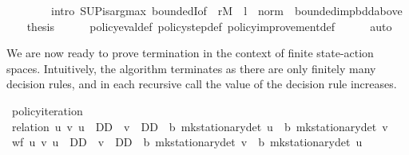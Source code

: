 \begin{isabellebody}
\ \ \ \ \ \ \ \ intro{\isacharbang}{\kern0pt}{\isacharcolon}{\kern0pt}\ SUP{\isacharunderscore}{\kern0pt}is{\isacharunderscore}{\kern0pt}arg{\isacharunderscore}{\kern0pt}max\ boundedI{\isacharbrackleft}{\kern0pt}of\ {\isacharunderscore}{\kern0pt}\ {\isachardoublequoteopen}r\isactrlsub M\ {\isacharplus}{\kern0pt}\ l\ {\isacharasterisk}{\kern0pt}\ norm\ {\isacharunderscore}{\kern0pt}{\isachardoublequoteclose}{\isacharbrackright}{\kern0pt}\ bounded{\isacharunderscore}{\kern0pt}imp{\isacharunderscore}{\kern0pt}bdd{\isacharunderscore}{\kern0pt}above{\isacharparenright}{\kern0pt}\isanewline
\ \ \isamarkupfalse%
\ {\isacharquery}{\kern0pt}thesis\isanewline
\ \ \ \ \isamarkupfalse%
\ policy{\isacharunderscore}{\kern0pt}eval{\isacharunderscore}{\kern0pt}def\ policy{\isacharunderscore}{\kern0pt}step{\isacharunderscore}{\kern0pt}def\ policy{\isacharunderscore}{\kern0pt}improvement{\isacharunderscore}{\kern0pt}def\isanewline
\ \ \ \ \isamarkupfalse%
\ auto\isanewline
{}\isamarkupfalse%
%
\endisatagproof
{\isafoldproof}%
%
\isadelimproof
%
\endisadelimproof
%
\begin{isamarkuptext}%
We are now ready to prove termination in the context of finite state-action spaces.
Intuitively, the algorithm terminates as there are only finitely many decision rules,
and in each recursive call the value of the decision rule increases.%
\end{isamarkuptext}\isamarkuptrue%
\isamarkupfalse%
\ policy{\isacharunderscore}{\kern0pt}iteration\isanewline
%
\isadelimproof
%
\endisadelimproof
%
\isatagproof
{}\isamarkupfalse%
\ {\isacharparenleft}{\kern0pt}relation\ {\isachardoublequoteopen}{\isacharbraceleft}{\kern0pt}{\isacharparenleft}{\kern0pt}u{\isacharcomma}{\kern0pt}\ v{\isacharparenright}{\kern0pt}{\isachardot}{\kern0pt}\ u\ {\isasymin}\ D\isactrlsub D\ {\isasymand}\ v\ {\isasymin}\ D\isactrlsub D\ {\isasymand}\ {\isasymnu}\isactrlsub b\ {\isacharparenleft}{\kern0pt}mk{\isacharunderscore}{\kern0pt}stationary{\isacharunderscore}{\kern0pt}det\ u{\isacharparenright}{\kern0pt}\ {\isachargreater}{\kern0pt}\ {\isasymnu}\isactrlsub b\ {\isacharparenleft}{\kern0pt}mk{\isacharunderscore}{\kern0pt}stationary{\isacharunderscore}{\kern0pt}det\ v{\isacharparenright}{\kern0pt}{\isacharbraceright}{\kern0pt}{\isachardoublequoteclose}{\isacharparenright}{\kern0pt}\isanewline
\ \ \isamarkupfalse%
\ {\isachardoublequoteopen}wf\ {\isacharbraceleft}{\kern0pt}{\isacharparenleft}{\kern0pt}u{\isacharcomma}{\kern0pt}\ v{\isacharparenright}{\kern0pt}{\isachardot}{\kern0pt}\ u\ {\isasymin}\ D\isactrlsub D\ {\isasymand}\ v\ {\isasymin}\ D\isactrlsub D\ {\isasymand}\ {\isasymnu}\isactrlsub b\ {\isacharparenleft}{\kern0pt}mk{\isacharunderscore}{\kern0pt}stationary{\isacharunderscore}{\kern0pt}det\ v{\isacharparenright}{\kern0pt}\ {\isacharless}{\kern0pt}\ {\isasymnu}\isactrlsub b\ {\isacharparenleft}{\kern0pt}mk{\isacharunderscore}{\kern0pt}stationary{\isacharunderscore}{\kern0pt}det\ u{\isacharparenright}{\kern0pt}{\isacharbraceright}{\kern0pt}{\isachardoublequoteclose}\isanewline

\end{isabellebody}
